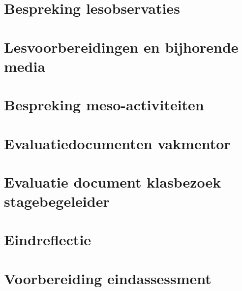 \documentclass[a4paper,12pt,twoside]{article}%
\begin{document}
\section{Bespreking lesobservaties}

\section{Lesvoorbereidingen en bijhorende media}

\section{Bespreking meso-activiteiten}

\section{Evaluatiedocumenten vakmentor}

\section{Evaluatie document klasbezoek stagebegeleider}

\section{Eindreflectie}

\section{Voorbereiding eindassessment}


















 
\end{document}
